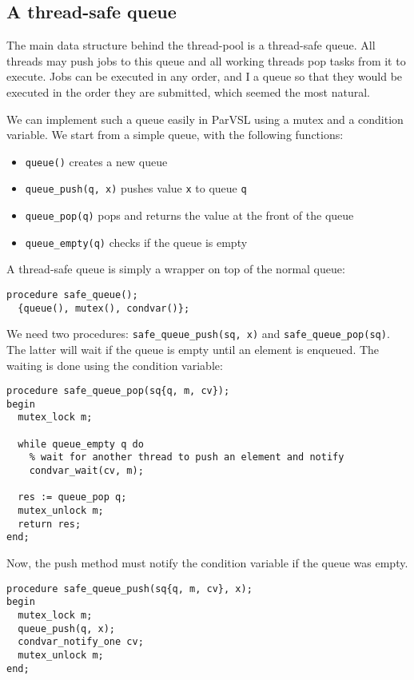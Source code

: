 \subsection{A thread-safe queue}

The main data structure behind the thread-pool is a thread-safe queue. All threads may push
jobs to this queue and all working threads pop tasks from it to execute. Jobs can be executed
in any order, and I a queue so that they would be executed in the order they are submitted, which
seemed the most natural.

We can implement such a queue easily in ParVSL using a mutex and a condition variable. We start
from a simple queue, with the following functions:

\begin{itemize}
\item \texttt{queue()} creates a new queue
\item \texttt{queue\_push(q, x)} pushes value \texttt{x} to queue \texttt{q}
\item \texttt{queue\_pop(q)} pops and returns the value at the front of the queue
\item \texttt{queue\_empty(q)} checks if the queue is empty
\end{itemize}

A thread-safe queue is simply a wrapper on top of the normal queue:
\begin{verbatim}
procedure safe_queue();
  {queue(), mutex(), condvar()};
\end{verbatim}

We need two procedures: \texttt{safe\_queue\_push(sq, x)} and \texttt{safe\_queue\_pop(sq)}. The latter will
wait if the queue is empty until an element is enqueued. The waiting is done using the condition variable:

\begin{verbatim}
procedure safe_queue_pop(sq{q, m, cv});
begin
  mutex_lock m;

  while queue_empty q do
    % wait for another thread to push an element and notify
    condvar_wait(cv, m);

  res := queue_pop q;
  mutex_unlock m;
  return res;
end;
\end{verbatim}

Now, the push method must notify the condition variable if the queue was empty.
\begin{verbatim}
procedure safe_queue_push(sq{q, m, cv}, x);
begin
  mutex_lock m;
  queue_push(q, x);
  condvar_notify_one cv;
  mutex_unlock m;
end;
\end{verbatim}


